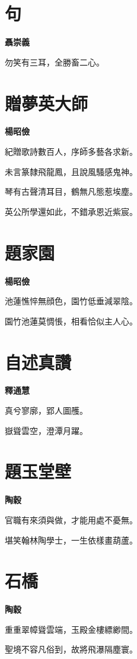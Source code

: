 \documentclass[12pt,a4paper]{ctexbook}
\begin{document}
\section{句}
\textbf{聶崇義}\par\vspace{0.5em}
勿笑有三耳，全勝畜二心。\par

\section{贈夢英大師}
\textbf{楊昭儉}\par\vspace{0.5em}
紀贈歌詩數百人，序師多藝各求新。\par
未言篆隸飛龍鳳，且說風騷感鬼神。\par
琴有古聲清耳目，鶴無凡態惹埃塵。\par
英公所學還如此，不錯承恩近紫宸。\par

\section{題家園}
\textbf{楊昭儉}\par\vspace{0.5em}
池蓮憔悴無顔色，園竹低垂減翠陰。\par
園竹池蓮莫惆悵，相看恰似主人心。\par

\section{自述真讚}
\textbf{釋通慧}\par\vspace{0.5em}
真兮寥廓，郢人圖雘。\par
嶽聳雲空，澄潭月躍。\par

\section{題玉堂壁}
\textbf{陶穀}\par\vspace{0.5em}
官職有來須與做，才能用處不憂無。\par
堪笑翰林陶學士，一生依樣畫葫蘆。\par

\section{石橋}
\textbf{陶穀}\par\vspace{0.5em}
重重翠幛聳雲端，玉殿金樓縹緲間。\par
聖境不容凡俗到，故將飛瀑隔塵寰。\par
\end{document}
